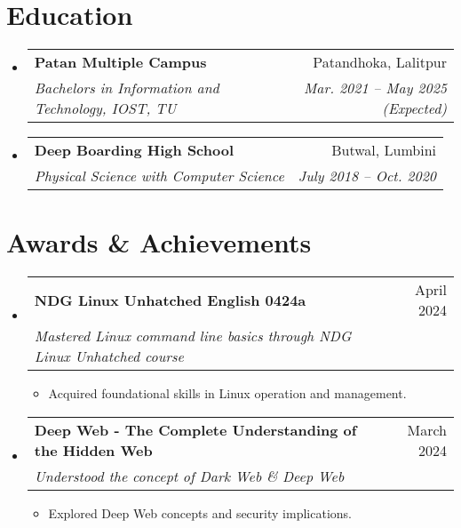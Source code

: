 \documentclass[letterpaper,11pt]{article}
\makeatletter
\newcommand{\resumeItem}[1]{
  \item\small{
    {#1 \vspace{-2pt}}
  }
}
\newcommand{\resumeSubheading}[4]{
  \vspace{-2pt}\item
    \begin{tabular*}{0.97\textwidth}[t]{l@{\extracolsep{\fill}}r}
      \textbf{#1} & #2 \\
      \textit{\small#3} & \textit{\small #4} \\
    \end{tabular*}\vspace{-7pt}
}
\newcommand{\resumeSubHeadingListStart}{\begin{itemize}[leftmargin=0.15in, label={}]}
\newcommand{\resumeSubHeadingListEnd}{\end{itemize}}
\newcommand{\resumeItemListStart}{\begin{itemize}}
\newcommand{\resumeItemListEnd}{\end{itemize}\vspace{-5pt}}
\makeatother
\begin{document}
\section{Education}
  \resumeSubHeadingListStart
    \resumeSubheading
      {Patan Multiple Campus}{Patandhoka, Lalitpur}
      {Bachelors in Information and Technology, IOST, TU}{Mar. 2021 -- May 2025 (Expected)}
    \resumeSubheading
      {Deep Boarding High School}{Butwal, Lumbini}
      {Physical Science with Computer Science}{July 2018 -- Oct. 2020}
  \resumeSubHeadingListEnd



\section{Awards \& Achievements}
\resumeSubHeadingListStart
    \resumeSubheading
      {NDG Linux Unhatched English 0424a}{April 2024}
      {Mastered Linux command line basics through NDG Linux Unhatched course}{}
    \resumeItemListStart
        \resumeItem{Acquired foundational skills in Linux operation and management.}
    \resumeItemListEnd
    
    \resumeSubheading
      {Deep Web - The Complete Understanding of the Hidden Web}{March 2024}
      {Understood the concept of Dark Web \& Deep Web}{}
    \resumeItemListStart
        \resumeItem{Explored Deep Web concepts and security implications.}
    \resumeItemListEnd
\resumeSubHeadingListEnd
\end{document}
